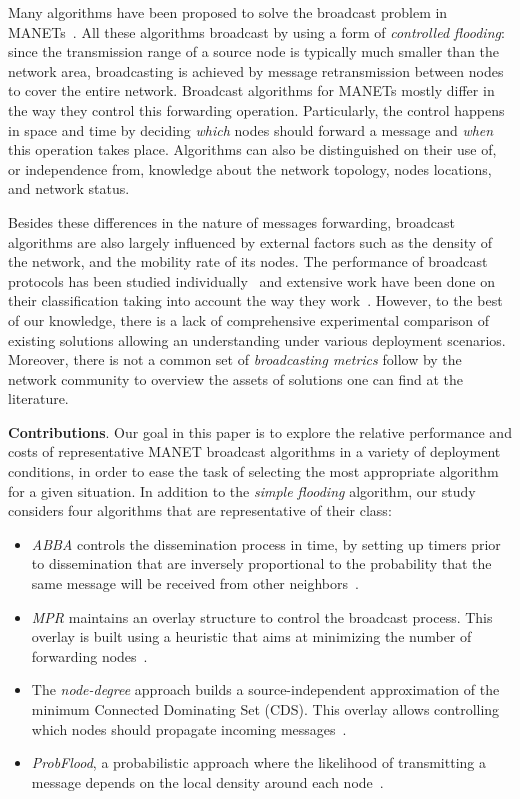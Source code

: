 Many algorithms have been proposed to solve the broadcast problem in MANETs~\cite{Ovalle-Martinez2006, Qayyum2002, Wu2001, Cartigny:2003:BNR:2727141.2727459, Wu2004, Stojmenovic:2002:DSN:506156.506158}.
%
All these algorithms broadcast by using a form of \emph{controlled flooding}: 
since the transmission range of a source node is typically much smaller than the network area, broadcasting is achieved by message retransmission between nodes to cover the entire network.
%
Broadcast algorithms for MANETs mostly differ in the way they control this forwarding operation.
%
Particularly, the control happens in space and time by deciding \emph{which} nodes should forward a message and \emph{when} this operation takes place.
%
Algorithms can also be distinguished on their use of, or independence from, knowledge about the network topology, nodes locations, and network status.

%
Besides these differences in the nature of messages forwarding, broadcast algorithms are also largely influenced by external factors such as the density of the network, and the mobility rate of its nodes.
%
The performance of broadcast protocols has been studied individually~\cite{YiGerla2003, Garbinato2010} and extensive work have been done on their classification taking into account the way they work~\cite{Ruiz2015, Fei1311289}.
%
However, to the best of our knowledge, there is a lack of comprehensive experimental comparison of existing solutions allowing an understanding under various deployment scenarios.
%
Moreover, there is not a common set of \textit{broadcasting metrics} follow by the network community to overview the assets of solutions one can find at the literature.

\noindent
\textbf{Contributions}.
%
Our goal in this paper is to explore the relative performance and costs of representative MANET broadcast algorithms in a variety of deployment conditions, in order to ease the task of selecting the most appropriate algorithm for a given situation.
%
In addition to the \textit{simple flooding} algorithm, our study considers four algorithms that are representative of their class:
\begin{itemize}
	\item \textit{ABBA} controls the dissemination process in time, by setting up timers prior to dissemination that are inversely proportional to the probability that the same message will be received from other neighbors~\cite{Ovalle-Martinez2006}.
	\item \textit{MPR} maintains an overlay structure to control the broadcast process. This overlay is built using a heuristic that aims at minimizing the number of forwarding nodes~\cite{Qayyum2002}.
	\item The \textit{node-degree} approach builds a source-independent approximation of the minimum Connected Dominating Set (CDS). This overlay allows controlling which nodes should propagate incoming messages~\cite{Wu2001}.
	\item \textit{ProbFlood}, a probabilistic approach where the likelihood of transmitting a message depends on the local density around each node~\cite{Cartigny:2003:BNR:2727141.2727459}.
\end{itemize}


